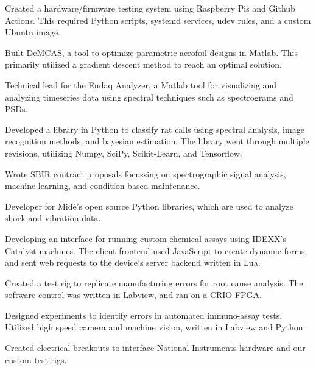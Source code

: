 \documentclass[letterpaper]{deedy-resume} %
\begin{document}
\begin{tightitemize}
\item Created a hardware/firmware testing system using Raspberry Pis and Github Actions.  This required Python scripts, systemd services, udev rules, and a custom Ubuntu image.
\item Built DeMCAS, a tool to optimize parametric aerofoil designs in Matlab.  This primarily utilized a gradient descent method to reach an optimal solution.
\item Technical lead for the Endaq Analyzer, a Matlab tool for visualizing and analyzing timeseries data using spectral techniques such as spectrograms and PSDs.
\item Developed a library in Python to classify rat calls using spectral analysis, image recognition methods, and bayesian estimation.  The library went through multiple revisions, utilizing Numpy, SciPy, Scikit-Learn, and Tensorflow.
\item Wrote SBIR contract proposals focussing on spectrographic signal analysis, machine learning, and condition-based maintenance.
\item Developer for Midé's open source Python libraries, which are used to analyze shock and vibration data.
\end{tightitemize}

\sectionspace %



\begin{tightitemize}
\item Developing an interface for running custom chemical assays using IDEXX's Catalyst machines.  The client frontend used JavaScript to create dynamic forms, and sent web requests to the device's server backend written in Lua.
\item Created a test rig to replicate manufacturing errors for root cause analysis.  The software control was written in Labview, and ran on a CRIO FPGA.
\item Designed experiments to identify errors in automated immuno-assay tests.  Utilized high speed camera and machine vision, written in Labview and Python.
\item Created electrical breakouts to interface National Instruments hardware and our custom test rigs.
\end{tightitemize}
\end{document}
